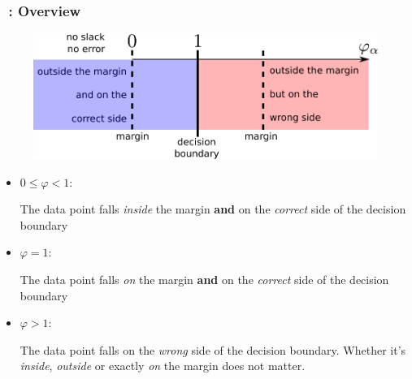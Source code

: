 \begin{frame}\frametitle{\subsubsecname~: Overview}

\begin{figure}[h]
	\centering
	\includegraphics[width=0.6\linewidth]{img/slack_values}%
    \label{fig:unconstrained}%
\end{figure}

\begin{itemize}
\item $0 \le \varphi < 1$:

The data point falls \emph{inside} the margin \textbf{and} on the \emph{correct} side of the decision boundary 


\item $\varphi = 1$:

The data point falls \emph{on} the margin \textbf{and} on the \emph{correct} side of the decision boundary 


\item $\varphi > 1$:

The data point falls on the \emph{wrong} side of the decision boundary. Whether it's \emph{inside}, \emph{outside} or exactly \emph{on} the margin does not matter.

\end{itemize}

\end{frame}


